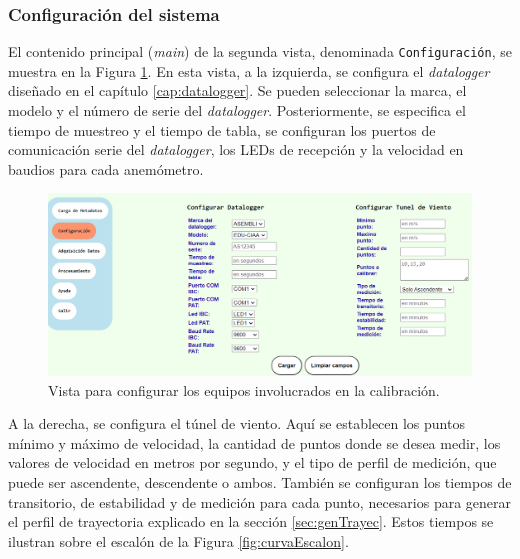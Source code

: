 \subsubsection{Configuración del sistema}\label{sec:configSistema}

El contenido principal (\textit{main}) de la segunda vista, denominada \texttt{Configuración}, se muestra en la Figura \ref{fig:configEquipos}. En esta vista, a la izquierda, se configura el \textit{datalogger} diseñado en el capítulo \ref{cap:datalogger}. Se pueden seleccionar la marca, el modelo y el número de serie del \textit{datalogger}. Posteriormente, se especifica el tiempo de muestreo y el tiempo de tabla, se configuran los puertos de comunicación serie del \textit{datalogger}, los LEDs de recepción y la velocidad en baudios para cada anemómetro.

\begin{figure}[H]
    \centering
    \includegraphics[width=1\linewidth]{Figuras/AplicacionWeb/frondend/configEquipos.png}
    \caption{Vista para configurar los equipos involucrados en la calibración.}
    \label{fig:configEquipos}
\end{figure}

A la derecha, se configura el túnel de viento. Aquí se establecen los puntos mínimo y máximo de velocidad, la cantidad de puntos donde se desea medir, los valores de velocidad en metros por segundo, y el tipo de perfil de medición, que puede ser ascendente, descendente o ambos. También se configuran los tiempos de transitorio, de estabilidad y de medición para cada punto, necesarios para generar el perfil de trayectoria explicado en la sección \ref{sec:genTrayec}. Estos tiempos se ilustran sobre el escalón de la Figura \ref{fig:curvaEscalon}.

